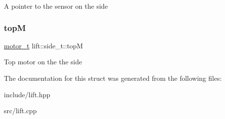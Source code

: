 A pointer to the sensor on the side \mbox{\label{structlift_1_1side__t_a98eccfefb378ed0a246a5f74a95f9020}} 
\subsubsection{\texorpdfstring{topM}{topM}}
{\footnotesize\ttfamily \hyperlink{structmotor__t}{motor\+\_\+t} lift\+::side\+\_\+t\+::topM}

Top motor on the the side 

The documentation for this struct was generated from the following files\+:\begin{DoxyCompactItemize}
\item 
include/lift.\+hpp\item 
src/lift.\+cpp\end{DoxyCompactItemize}
